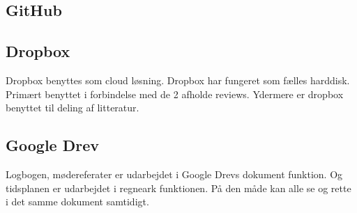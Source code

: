 \subsection{GitHub}


\subsection{Dropbox}

Dropbox benyttes som cloud løsning. Dropbox har fungeret som fælles harddisk. Primært benyttet i forbindelse med de 2 afholde reviews. Ydermere er dropbox benyttet til deling af litteratur. 

\subsection{Google Drev}

Logbogen, mødereferater er udarbejdet i Google Drevs dokument funktion. Og tidsplanen er udarbejdet i regneark funktionen. På den måde kan alle se og rette i det samme dokument samtidigt. 


